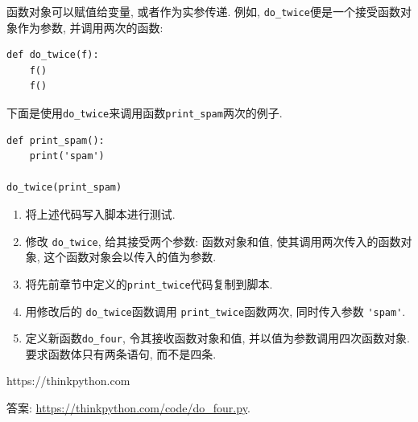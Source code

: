 \documentclass[10pt]{book}
\begin{document}
\begin{exercise}

函数对象可以赋值给变量, 或者作为实参传递. 
例如, \verb"do_twice"便是一个接受函数对象作为参数, 并调用两次的函数:

\begin{verbatim}
def do_twice(f):
    f()
    f()
\end{verbatim}

下面是使用\verb"do_twice"来调用函数\verb"print_spam"两次的例子. 

\begin{verbatim}
def print_spam():
    print('spam')

do_twice(print_spam)
\end{verbatim}

\begin{enumerate}

\item 将上述代码写入脚本进行测试.

\item 修改 \verb"do_twice", 给其接受两个参数: 函数对象和值, 
使其调用两次传入的函数对象, 这个函数对象会以传入的值为参数.

\item 将先前章节中定义的\verb"print_twice"代码复制到脚本.

\item 用修改后的 \verb"do_twice"函数调用 \verb"print_twice"函数两次, 
同时传入参数 \verb"'spam'".

\item 定义新函数\verb"do_four", 令其接收函数对象和值, 
并以值为参数调用四次函数对象. 
要求函数体只有两条语句, 而不是四条. 

\end{enumerate}https://thinkpython.com

答案: \url{https://thinkpython.com/code/do_four.py}.

\end{exercise}
\end{document}
